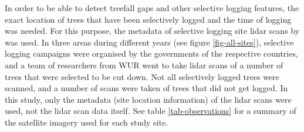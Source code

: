 \documentclass[a4paper,12pt]{scrbook}
\begin{document}
\begin{table}
  \caption{Summary of satellite imagery used for each study site. Observations are the total number of images processed for the study site, stable history indicates whether there were enough observations before the logging event to allow for analysis based on time series.}
  \label{tab-observations}
\end{table}


In order to be able to detect treefall gaps and other selective logging features, the exact location of trees that have been selectively logged and the time of logging was needed. For this purpose, the metadata of selective logging site lidar scans by \citet{gonzalez_de_tanago_menaca_estimation_2017} was used. In three areas during different years (see figure \ref{fig-all-sites}), selective logging campaigns were organised by the governments of the respective countries, and a team of researchers from \ac{WUR} went to take lidar scans of a number of trees that were selected to be cut down. Not all selectively logged trees were scanned, and a number of scans were taken of trees that did not get logged. In this study, only the metadata (site location information) of the lidar scans were used, not the lidar scan data itself. See table \ref{tab-observations} for a summary of the satellite imagery used for each study site.
\end{document}
